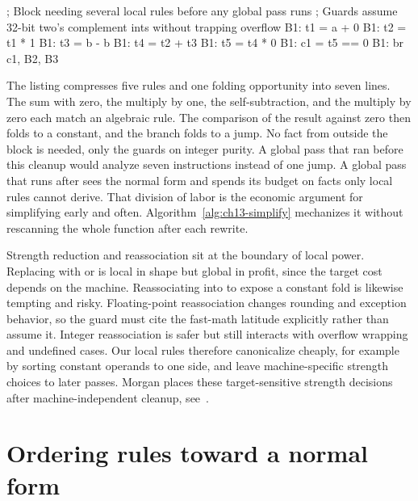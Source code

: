 \begin{irlisting}
; Block needing several local rules before any global pass runs
; Guards assume 32-bit two's complement ints without trapping overflow
B1: t1 = a + 0
B1: t2 = t1 * 1
B1: t3 = b - b
B1: t4 = t2 + t3
B1: t5 = t4 * 0
B1: c1 = t5 == 0
B1: br c1, B2, B3
\end{irlisting}

The listing compresses five rules and one folding opportunity into seven lines.
The sum with zero, the multiply by one, the self-subtraction, and the multiply by zero each match an algebraic rule.
The comparison of the result against zero then folds to a constant, and the branch folds to a jump.
No fact from outside the block is needed, only the guards on integer purity.
A global pass that ran before this cleanup would analyze seven instructions instead of one jump.
A global pass that runs after sees the normal form and spends its budget on facts only local rules cannot derive.
That division of labor is the economic argument for simplifying early and often.
Algorithm~\ref{alg:ch13-simplify} mechanizes it without rescanning the whole function after each rewrite.

Strength reduction and reassociation sit at the boundary of local power.
Replacing  with  or  is local in shape but global in profit, since the target cost depends on the machine.
Reassociating  into  to expose a constant fold is likewise tempting and risky.
Floating-point reassociation changes rounding and exception behavior, so the guard must cite the fast-math latitude explicitly rather than assume it.
Integer reassociation is safer but still interacts with overflow wrapping and undefined cases.
Our local rules therefore canonicalize cheaply, for example by sorting constant operands to one side, and leave machine-specific strength choices to later passes.
Morgan places these target-sensitive strength decisions after machine-independent cleanup, see~\cite{morgan-1998-optimizing}.

\section{Ordering rules toward a normal form}
\label{sec:ch13-order}

